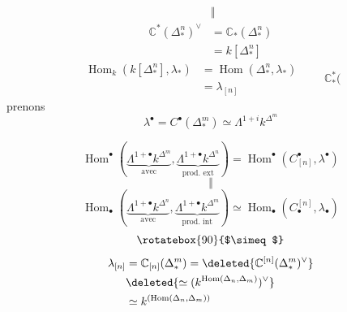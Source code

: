 \[
\begin{aligned}
&\Vert\\
\mathbb C^*(\Delta_*^n)^\vee
&=\mathbb C_*(\Delta_*^n)\\
&=k[\Delta_*^n]
\end{aligned}
\]
\[
\begin{aligned}
\operatorname{Hom}_k(k[\Delta_*^n],\lambda_*)&=\operatorname{Hom}(\Delta_*^n,\lambda_*)\\
&=\lambda_{[n]}
\end{aligned}
\qquad \mathbb C_*^*(
\]
prenons
\[
\lambda^\bullet=C^\bullet(\Delta_*^m)\simeq\Lambda^{1+i}k^{\Delta^m}
\]

\[
\operatorname{Hom}^\bullet(
\underbrace{\Lambda^{1+\bullet}k^{\Delta^m}}_{\text{avec}},
\underbrace{\Lambda^{1+\bullet}k^{\Delta^n}}_{\text{prod. ext}})
=\operatorname{Hom}^\bullet(C_{[n]}^\bullet,\lambda^\bullet)
\]
\[
\Vert
\]
\[
\operatorname{Hom}_\bullet(
\underbrace{\Lambda^{1+\bullet}k^{\Delta^n}}_{\text{avec}},
\underbrace{\Lambda^{1+\bullet}k^{\Delta^m}}_{\text{prod. int}})
\simeq\operatorname{Hom}_\bullet(C_\bullet^{[n]},\lambda_\bullet)
\]
\[
\rotatebox{90}{$\simeq$}
\]
\[
\begin{aligned}
\lambda_{[n]}&=\mathbb C_{[n]}(\Delta_*^m)
=\deleted{\mathbb C^{[n]}(\Delta_*^m)^\vee}\\
&\deleted{\simeq(k^{\operatorname{Hom}(\Delta_n,\Delta_m)})^\vee}\\
&\simeq k^{(\operatorname{Hom}(\Delta_n,\Delta_m))}
\end{aligned}
\]

